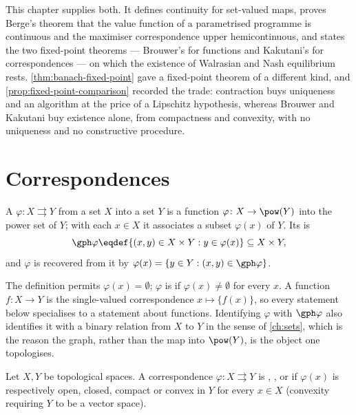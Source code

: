 This chapter supplies both. It defines continuity for set-valued maps, proves
Berge's theorem that the value function of a parametrised programme is continuous
and the maximiser correspondence upper hemicontinuous, and states the two
fixed-point theorems --- Brouwer's for functions and Kakutani's for
correspondences --- on which the existence of Walrasian and Nash equilibrium
rests. \autoref{thm:banach-fixed-point} gave a fixed-point theorem of a different
kind, and \autoref{prop:fixed-point-comparison} recorded the trade: contraction
buys uniqueness and an algorithm at the price of a Lipschitz hypothesis, whereas
Brouwer and Kakutani buy existence alone, from compactness and convexity, with no
uniqueness and no constructive procedure.

\section{Correspondences}\label{sec:corr-basic}

\begin{definition}[Correspondence]\label{def:correspondence}
	A  $\varphi\colon X\rightrightarrows Y$
	from a set $X$ into a set $Y$ is a function $\varphi\colon X\to\pow(Y)$ into the
	power set of $Y$; with each $x\in X$ it associates a subset $\varphi(x)$ of $Y$.
	Its  is
	\[
		\gph\varphi\eqdef\{(x,y)\in X\times Y : y\in\varphi(x)\}\subseteq X\times Y,
	\]
	and $\varphi$ is recovered from it by
	$\varphi(x)=\{y\in Y : (x,y)\in\gph\varphi\}$.
\end{definition}

The definition permits $\varphi(x)=\emptyset$; $\varphi$ is
 if
$\varphi(x)\neq\emptyset$ for every $x$. A function $f\colon X\to Y$ is the
single-valued correspondence $x\mapsto\{f(x)\}$, so every statement below
specialises to a statement about functions. Identifying $\varphi$ with $\gph\varphi$ also identifies it
with a binary relation from $X$ to $Y$ in the sense of
\autoref{ch:sets}, which is the reason the graph, rather than the map into
$\pow(Y)$, is the object one topologises.

\begin{definition}\label{def:corr-values}
	Let $X,Y$ be topological spaces. A correspondence
	$\varphi\colon X\rightrightarrows Y$ is ,
	,  or  if
	$\varphi(x)$ is respectively open, closed, compact or convex in $Y$ for every
	$x\in X$ (convexity requiring $Y$ to be a vector space).
\end{definition}

